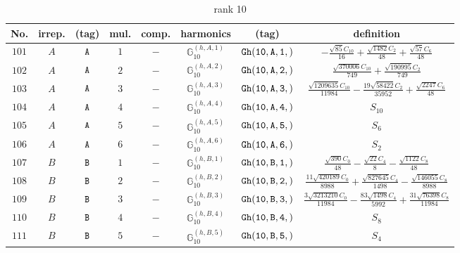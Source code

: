 \documentclass[fleqn,8pt]{jsarticle}
\begin{document}
\begin{table}[ht!]
\begin{center}
\caption{rank 10}
\renewcommand{\arraystretch}{1.3}
\begin{tabular}{cccccccc} \hline \hline
No. & irrep. & (tag) & mul. & comp. & harmonics & (tag) & definition \\ \hline
$ 101 $ & $ A $ & $ {\tt A} $ & $ 1 $ & $ - $ & $ \mathbb{G}_{10}^{(h,A,1)} $ & $ {\tt Gh(10,A,1,)} $ & $ - \frac{\sqrt{85} C_{10}}{16} + \frac{\sqrt{1482} C_{2}}{48} + \frac{\sqrt{57} C_{6}}{48} $ \\
$ 102 $ & $ A $ & $ {\tt A} $ & $ 2 $ & $ - $ & $ \mathbb{G}_{10}^{(h,A,2)} $ & $ {\tt Gh(10,A,2,)} $ & $ \frac{\sqrt{370006} C_{10}}{749} + \frac{\sqrt{190995} C_{2}}{749} $ \\
$ 103 $ & $ A $ & $ {\tt A} $ & $ 3 $ & $ - $ & $ \mathbb{G}_{10}^{(h,A,3)} $ & $ {\tt Gh(10,A,3,)} $ & $ \frac{\sqrt{1209635} C_{10}}{11984} - \frac{19 \sqrt{58422} C_{2}}{35952} + \frac{\sqrt{2247} C_{6}}{48} $ \\
$ 104 $ & $ A $ & $ {\tt A} $ & $ 4 $ & $ - $ & $ \mathbb{G}_{10}^{(h,A,4)} $ & $ {\tt Gh(10,A,4,)} $ & $ S_{10} $ \\
$ 105 $ & $ A $ & $ {\tt A} $ & $ 5 $ & $ - $ & $ \mathbb{G}_{10}^{(h,A,5)} $ & $ {\tt Gh(10,A,5,)} $ & $ S_{6} $ \\
$ 106 $ & $ A $ & $ {\tt A} $ & $ 6 $ & $ - $ & $ \mathbb{G}_{10}^{(h,A,6)} $ & $ {\tt Gh(10,A,6,)} $ & $ S_{2} $ \\
$ 107 $ & $ B $ & $ {\tt B} $ & $ 1 $ & $ - $ & $ \mathbb{G}_{10}^{(h,B,1)} $ & $ {\tt Gh(10,B,1,)} $ & $ \frac{\sqrt{390} C_{0}}{48} - \frac{\sqrt{22} C_{4}}{8} - \frac{\sqrt{1122} C_{8}}{48} $ \\
$ 108 $ & $ B $ & $ {\tt B} $ & $ 2 $ & $ - $ & $ \mathbb{G}_{10}^{(h,B,2)} $ & $ {\tt Gh(10,B,2,)} $ & $ \frac{11 \sqrt{420189} C_{0}}{8988} + \frac{\sqrt{827645} C_{4}}{1498} - \frac{\sqrt{146055} C_{8}}{8988} $ \\
$ 109 $ & $ B $ & $ {\tt B} $ & $ 3 $ & $ - $ & $ \mathbb{G}_{10}^{(h,B,3)} $ & $ {\tt Gh(10,B,3,)} $ & $ \frac{3 \sqrt{3213210} C_{0}}{11984} - \frac{83 \sqrt{1498} C_{4}}{5992} + \frac{31 \sqrt{76398} C_{8}}{11984} $ \\
$ 110 $ & $ B $ & $ {\tt B} $ & $ 4 $ & $ - $ & $ \mathbb{G}_{10}^{(h,B,4)} $ & $ {\tt Gh(10,B,4,)} $ & $ S_{8} $ \\
$ 111 $ & $ B $ & $ {\tt B} $ & $ 5 $ & $ - $ & $ \mathbb{G}_{10}^{(h,B,5)} $ & $ {\tt Gh(10,B,5,)} $ & $ S_{4} $ \\

\end{tabular}
\end{center}
\end{table}
\end{document}
